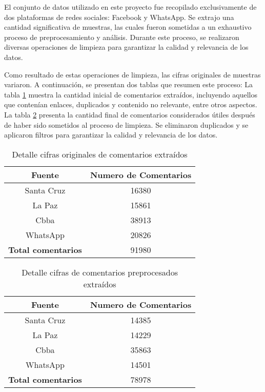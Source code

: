 El conjunto de datos utilizado en este proyecto fue recopilado exclusivamente de dos plataformas de redes sociales: Facebook y WhatsApp. Se extrajo una cantidad significativa de muestras, las cuales fueron sometidas a un exhaustivo proceso de preprocesamiento y análisis. Durante este proceso, se realizaron diversas operaciones de limpieza para garantizar la calidad y relevancia de los datos.

Como resultado de estas operaciones de limpieza, las cifras originales de muestras variaron. A continuación, se presentan dos tablas que resumen este proceso: La tabla \ref{tbl:14} muestra la cantidad inicial de comentarios extraídos, incluyendo aquellos que contenían enlaces, duplicados y contenido no relevante, entre otros aspectos. La tabla \ref{tbl:15} presenta la cantidad final de comentarios considerados útiles después de haber sido sometidos al proceso de limpieza. Se eliminaron duplicados y se aplicaron filtros para garantizar la calidad y relevancia de los datos.

\begin{table}[!ht]
	\centering
	\begin{tabular}{|c|c|}
		\hline
		\textbf{Fuente} & \textbf{Numero de Comentarios} \\ \hline
		Santa Cruz & 16380 \\ 
		La Paz & 15861 \\ 
		Cbba & 38913 \\ 
		WhatsApp & 20826 \\ \hline
		\textbf{Total comentarios} & 91980 \\ \hline
	\end{tabular}
	\caption{Detalle cifras originales de comentarios extraídos}
	\label{tbl:14}
\end{table}

\begin{table}[!ht]
	\centering
	\begin{tabular}{|c|c|}
		\hline
		\textbf{Fuente} & \textbf{Numero de Comentarios} \\ \hline
		Santa Cruz & 14385 \\ 
		La Paz & 14229 \\ 
		Cbba & 35863 \\ 
		WhatsApp & 14501 \\ \hline
		\textbf{Total comentarios} & 78978 \\ \hline
	\end{tabular}
	\caption{Detalle cifras de comentarios preprocesados extraídos}
	\label{tbl:15}
\end{table}


